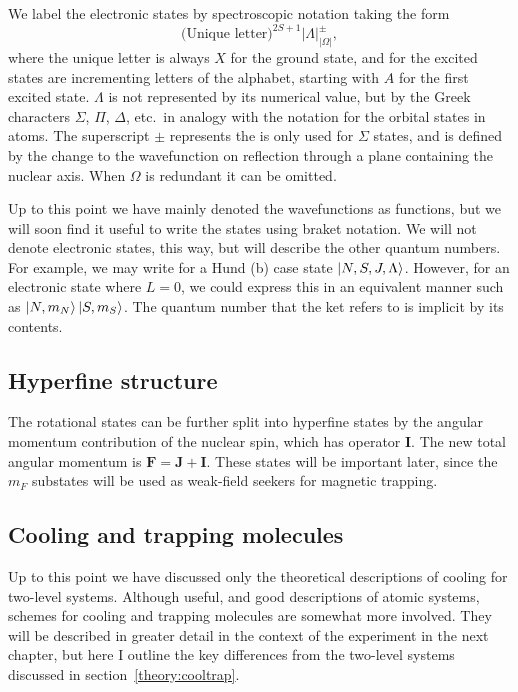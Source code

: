 We label the electronic states by spectroscopic notation taking the form
%
\begin{equation*} 
  \text{(Unique letter)}^{2S+1}|\Lambda|^\pm_{|\Omega|},
\end{equation*}
%
where the unique letter is always $X$ for the ground state, and for the excited
states are 
incrementing letters of the alphabet, starting with $A$ for the first
excited state. $\Lambda$ is not represented by its numerical value, but
by the Greek characters $\Sigma$, $\Pi$, $\Delta$, etc.\ in analogy with the
notation for the orbital states in atoms. The superscript $\pm$ represents the
is only used for $\Sigma$ states, and is defined by the change to
the wavefunction on reflection through a plane containing the nuclear axis.
When $\Omega$ is redundant it can be omitted.

Up to this point we have mainly denoted the wavefunctions as functions, but we
will soon find it useful to write the states using braket notation. We will not
denote electronic states, this way, but will describe the other quantum
numbers. For example, we may write for a Hund (b) case state $\ket{N, S, J,
\Lambda}$. However, for an electronic state where $L=0$, we could express this
in an equivalent manner such as $\ket{N, m_N}\ket{S, m_S}$. The
quantum number that the ket refers to is implicit by its contents.

\subsection{Hyperfine structure}

The rotational states can be further split into hyperfine states by the angular
momentum contribution of the nuclear spin, which has operator $\mathbf{I}$. The
new total angular momentum is  $\mathbf{F} = \mathbf{J} + \mathbf{I}$. These
states will be important later, since the $m_F$ substates will be used as
weak-field seekers for magnetic trapping.

\subsection{Cooling and trapping molecules}
\label{theory:coolmols}

Up to this point we have discussed only the theoretical descriptions of cooling
for two-level systems. Although useful, and good descriptions of atomic
systems, schemes for cooling and trapping molecules are somewhat more involved.
They will be described in greater detail in the context of the \CaF{}
experiment in the next chapter, but here I outline the key differences from the
two-level systems discussed in section~\ref{theory:cooltrap}.

